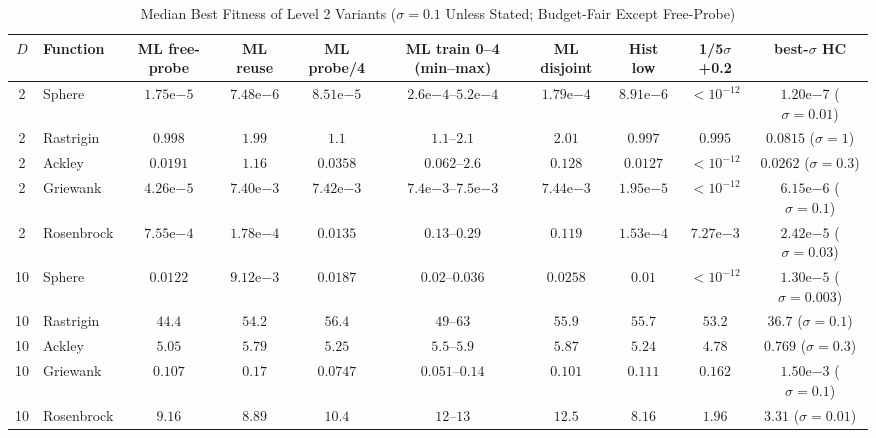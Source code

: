 \documentclass[conference]{IEEEtran}
\begin{document}
\begin{table}[t]
\centering
\caption{Median Best Fitness of Level 2 Variants ($\sigma=0.1$ Unless Stated; Budget-Fair Except Free-Probe)}
\label{tab:var}
\scriptsize
\setlength{\tabcolsep}{2pt}
\begin{tabular}{@{}clcccccccc@{}}
\toprule
$D$ & Function & ML free-probe & ML reuse & ML probe/4 & ML train 0--4 (min--max) & ML disjoint & Hist low & 1/5$\sigma$+0.2 & best-$\sigma$ HC\\
\midrule
2 & Sphere & $1.75\mathrm{e}{-5}$ & $7.48\mathrm{e}{-6}$ & $8.51\mathrm{e}{-5}$ & $2.6\mathrm{e}{-4}$--$5.2\mathrm{e}{-4}$ & $1.79\mathrm{e}{-4}$ & $8.91\mathrm{e}{-6}$ & $<\!10^{-12}$ & $1.20\mathrm{e}{-7}$ ($\sigma{=}0.01$) \\
2 & Rastrigin & $0.998$ & $1.99$ & $1.1$ & $1.1$--$2.1$ & $2.01$ & $0.997$ & $0.995$ & $0.0815$ ($\sigma{=}1$) \\
2 & Ackley & $0.0191$ & $1.16$ & $0.0358$ & $0.062$--$2.6$ & $0.128$ & $0.0127$ & $<\!10^{-12}$ & $0.0262$ ($\sigma{=}0.3$) \\
2 & Griewank & $4.26\mathrm{e}{-5}$ & $7.40\mathrm{e}{-3}$ & $7.42\mathrm{e}{-3}$ & $7.4\mathrm{e}{-3}$--$7.5\mathrm{e}{-3}$ & $7.44\mathrm{e}{-3}$ & $1.95\mathrm{e}{-5}$ & $<\!10^{-12}$ & $6.15\mathrm{e}{-6}$ ($\sigma{=}0.1$) \\
2 & Rosenbrock & $7.55\mathrm{e}{-4}$ & $1.78\mathrm{e}{-4}$ & $0.0135$ & $0.13$--$0.29$ & $0.119$ & $1.53\mathrm{e}{-4}$ & $7.27\mathrm{e}{-3}$ & $2.42\mathrm{e}{-5}$ ($\sigma{=}0.03$) \\
\midrule
10 & Sphere & $0.0122$ & $9.12\mathrm{e}{-3}$ & $0.0187$ & $0.02$--$0.036$ & $0.0258$ & $0.01$ & $<\!10^{-12}$ & $1.30\mathrm{e}{-5}$ ($\sigma{=}0.003$) \\
10 & Rastrigin & $44.4$ & $54.2$ & $56.4$ & $49$--$63$ & $55.9$ & $55.7$ & $53.2$ & $36.7$ ($\sigma{=}0.1$) \\
10 & Ackley & $5.05$ & $5.79$ & $5.25$ & $5.5$--$5.9$ & $5.87$ & $5.24$ & $4.78$ & $0.769$ ($\sigma{=}0.3$) \\
10 & Griewank & $0.107$ & $0.17$ & $0.0747$ & $0.051$--$0.14$ & $0.101$ & $0.111$ & $0.162$ & $1.50\mathrm{e}{-3}$ ($\sigma{=}0.1$) \\
10 & Rosenbrock & $9.16$ & $8.89$ & $10.4$ & $12$--$13$ & $12.5$ & $8.16$ & $1.96$ & $3.31$ ($\sigma{=}0.01$) \\
\bottomrule
\end{tabular}
\end{table}
\end{document}
